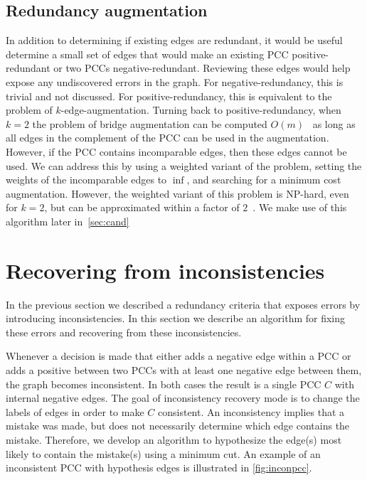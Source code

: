 \subsection{Redundancy augmentation}\label{subsec:augredun}

In addition to determining if existing edges are redundant, it would be useful determine a small set of edges
  that would make an existing PCC positive-redundant or two PCCs negative-redundant.
Reviewing these edges would help expose any undiscovered errors in the graph.
For negative-redundancy, this is trivial and not discussed.
For positive-redundancy, this is equivalent to the problem of $k$-edge-augmentation.
Turning back to positive-redundancy, when $k=2$ the problem of bridge augmentation can be computed
  $O(m)$~\cite{eswaran_augmentation_1976} as long as all edges in the complement of the PCC can be used in the
  augmentation.
However, if the PCC contains incomparable edges, then these edges cannot be used.
We can address this by using a weighted variant of the problem, setting the weights of the incomparable edges to
  $\inf$, and searching for a minimum cost augmentation.
However, the weighted variant of this problem is NP-hard, even for $k=2$, but can be approximated within a factor
  of $2$~\cite{khuller_approximation_1993}.
We make use of this algorithm later in~\cref{sec:cand}



\section{Recovering from inconsistencies}\label{sec:incon}

In the previous section we described a redundancy criteria that exposes errors by introducing inconsistencies.
In this section we describe an algorithm for fixing these errors and recovering from these inconsistencies.

Whenever a decision is made that either adds a negative edge within a PCC or adds a positive between two PCCs
  with at least one negative edge between them, the graph becomes inconsistent.
In both cases the result is a single PCC $C$ with internal negative edges.
The goal of inconsistency recovery mode is to change the labels of edges in order to make $C$ consistent.
An inconsistency implies that a mistake was made, but does not necessarily determine which edge contains the
  mistake.
Therefore, we develop an algorithm to hypothesize the edge(s) most likely to contain the mistake(s) using a
  minimum cut.
An example of an inconsistent PCC with hypothesis edges is illustrated in \cref{fig:inconpcc}.


